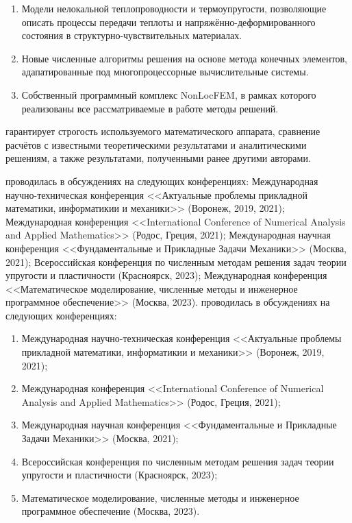 {}
\begin{enumerate}[beginpenalty=10000] %
 	\item Модели нелокальной теплопроводности и термоупругости, позволяющие описать процессы передачи теплоты и напряжённо-деформированного состояния в структурно-чувствительных материалах.
	\item Новые численные алгоритмы решения на основе метода конечных элементов, адапатированные под многопроцессорные вычислительные системы.
	\item Собственный программный комплекс NonLocFEM, в рамках которого реализованы все рассматриваемые в работе методы решений.
\end{enumerate}

{\reliability} гарантирует строгость используемого математического аппарата, сравнение расчётов с известными теоретическими результатами и аналитическими решениям, а также результатами, полученными ранее другими авторами.

\ifsynopsis
{\probation} проводилась в обсуждениях на следующих конференциях:
Международная научно-техническая конференция <<Актуальные проблемы прикладной математики, информатикии и механики>> (Воронеж, 2019, 2021); Международная конференция <<International Conference of Numerical Analysis and Applied Mathematics>> (Родос, Греция, 2021); Международная научная конференция <<Фундаментальные и Прикладные Задачи Механики>> (Москва, 2021); Всероссийская конференция по численным методам решения задач теории упругости и пластичности (Красноярск, 2023); Международная конференция <<Математическое моделирование, численные методы и инженерное программное обеспечение>> (Москва, 2023).
\else
{\probation} проводилась в обсуждениях на следующих конференциях:
\begin{enumerate}
	\item Международная научно-техническая конференция <<Актуальные проблемы прикладной математики, информатикии и механики>> (Воронеж, 2019, 2021);
	\item Международная конференция <<International Conference of Numerical Analysis and Applied Mathematics>> (Родос, Греция, 2021);
	\item Международная научная конференция <<Фундаментальные и Прикладные Задачи Механики>> (Москва, 2021);
	\item Всероссийская конференция по численным методам решения задач теории упругости и пластичности (Красноярск, 2023);
	\item Математическое моделирование, численные методы и инженерное программное обеспечение (Москва, 2023).
\end{enumerate}
\fi

